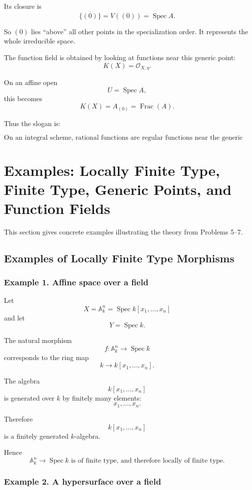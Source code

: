 \documentclass[12pt,a4paper]{article}
\theoremstyle{notespace}
\begin{document}
Its closure is
\[
\overline{\{(0)\}}=V((0))=\operatorname{Spec}A.
\]

So \((0)\) lies ``above'' all other points in the specialization order. It represents the whole irreducible space.

The function field is obtained by looking at functions near this generic point:
\[
K(X)=\mathcal{O}_{X,\eta}.
\]

On an affine open
\[
U=\operatorname{Spec}A,
\]
this becomes
\[
K(X)=A_{(0)}=\operatorname{Frac}(A).
\]

Thus the slogan is:

\[
\boxed{
	\text{On an integral scheme, rational functions are regular functions near the generic point.}
}
\]

\section{Examples: Locally Finite Type, Finite Type, Generic Points, and Function Fields}

This section gives concrete examples illustrating the theory from Problems 5--7.

\subsection{Examples of Locally Finite Type Morphisms}

\subsubsection*{Example 1. Affine space over a field}

Let
\[
X=\mathbb{A}^n_k=\operatorname{Spec}k[x_1,\dots,x_n]
\]
and let
\[
Y=\operatorname{Spec}k.
\]

The natural morphism
\[
f:\mathbb{A}^n_k\to \operatorname{Spec}k
\]
corresponds to the ring map
\[
k\to k[x_1,\dots,x_n].
\]

The algebra
\[
k[x_1,\dots,x_n]
\]
is generated over \(k\) by finitely many elements:
\[
x_1,\dots,x_n.
\]

Therefore
\[
k[x_1,\dots,x_n]
\]
is a finitely generated \(k\)-algebra.

Hence
\[
\boxed{
	\mathbb{A}^n_k\to \operatorname{Spec}k
	\text{ is of finite type, and therefore locally of finite type.}
}
\]

\subsubsection*{Example 2. A hypersurface over a field}
\end{document}
